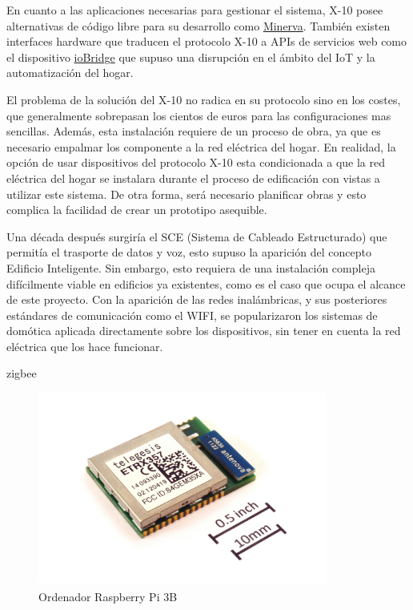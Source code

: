 \vspace{1.5cm}

En cuanto a las aplicaciones necesarias para gestionar el sistema, X-10 posee alternativas de código libre para su desarrollo como \href{http://www.minervahome.net/}{Minerva}. También existen interfaces hardware que traducen el protocolo X-10 a APIs de servicios web como el dispositivo \href{http://www.iobridge.com/}{ioBridge} que supuso una disrupción en el ámbito del IoT y la automatización del hogar.

\vspace{1.5cm}

El problema de la solución del X-10 no radica en su protocolo sino en los costes, que generalmente sobrepasan los cientos de euros para las configuraciones mas sencillas. Además, esta instalación requiere de un proceso de obra, ya que es necesario empalmar los componente a la red eléctrica del hogar. En realidad, la opción de usar dispositivos del protocolo X-10 esta condicionada a que la red eléctrica del hogar se instalara durante el proceso de edificación con vistas a utilizar este sistema. De otra forma, será necesario planificar obras y esto complica la facilidad de crear un prototipo asequible.

\vspace{1.5cm}

Una década después surgiría el SCE (Sistema de Cableado Estructurado) que permitía el trasporte de datos y voz, esto supuso la aparición del concepto Edificio Inteligente. Sin embargo, esto requiera de una instalación compleja difícilmente viable en edificios ya existentes, como es el caso que ocupa el alcance de este proyecto. Con la aparición de las redes inalámbricas, y sus posteriores estándares de comunicación como el WIFI, se popularizaron los sistemas de domótica aplicada directamente sobre los dispositivos, sin tener en cuenta la red eléctrica que los hace funcionar.

zigbee
\begin{figure}[hbt!]
\centering
\includegraphics[height=2.5in]{figures/ETRX357_ZigBee_module_with_size_ref.jpg}
\caption[captura de una Raspberry]{Ordenador Raspberry Pi 3B\footnotemark}
\end{figure}



